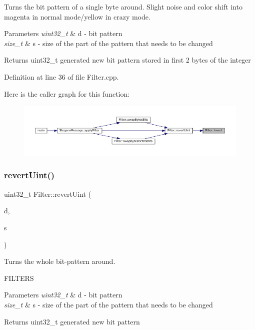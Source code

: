 Turns the bit pattern of a single byte around. Slight noise and color shift into magenta in normal mode/yellow in crazy mode. 


\begin{DoxyParams}{Parameters}
{\em uint32\+\_\+t} & d -\/ bit pattern \\
\hline
{\em size\+\_\+t} & s -\/ size of the part of the pattern that needs to be changed \\
\hline
\end{DoxyParams}
\begin{DoxyReturn}{Returns}
uint32\+\_\+t generated new bit pattern stored in first 2 bytes of the integer 
\end{DoxyReturn}


Definition at line 36 of file Filter.\+cpp.

Here is the caller graph for this function\+:\nopagebreak
\begin{figure}[H]
\begin{center}
\leavevmode
\includegraphics[width=350pt]{classFilter_a55f792b3f87991db5a5e666827d6214c_icgraph}
\end{center}
\end{figure}
\mbox{\label{classFilter_ae4a4b081886014742d083d9a2b285981}} 
\subsubsection{\texorpdfstring{revertUint()}{revertUint()}}
{\footnotesize\ttfamily uint32\+\_\+t Filter\+::revert\+Uint (\begin{DoxyParamCaption}\item[{uint32\+\_\+t}]{d,  }\item[{size\+\_\+t}]{s }\end{DoxyParamCaption})\hspace{0.3cm}{\ttfamily [static]}}



Turns the whole bit-\/pattern around. 

F\+I\+L\+T\+E\+RS
\begin{DoxyParams}{Parameters}
{\em uint32\+\_\+t} & d -\/ bit pattern \\
\hline
{\em size\+\_\+t} & s -\/ size of the part of the pattern that needs to be changed \\
\hline
\end{DoxyParams}
\begin{DoxyReturn}{Returns}
uint32\+\_\+t generated new bit pattern 
\end{DoxyReturn}


